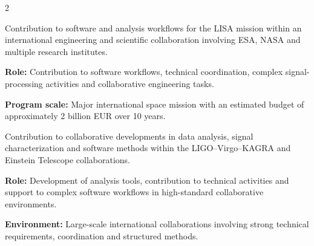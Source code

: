 \documentclass[8pt,a4paper,ragged2e,withhyper]{altacv}
\begin{document}
\begin{paracol}{2}







\end{paracol}

\newpage
{}


Contribution to software and analysis workflows for the LISA mission within an international engineering and scientific collaboration involving ESA, NASA and multiple research institutes.

\textbf{Role:} Contribution to software workflows, technical coordination, complex signal-processing activities and collaborative engineering tasks.

\textbf{Program scale:} Major international space mission with an estimated budget of approximately 2 billion EUR over 10 years.

\divider


Contribution to collaborative developments in data analysis, signal characterization and software methods within the LIGO--Virgo--KAGRA and Einstein Telescope collaborations.

\textbf{Role:} Development of analysis tools, contribution to technical activities and support to complex software workflows in high-standard collaborative environments.

\textbf{Environment:} Large-scale international collaborations involving strong technical requirements, coordination and structured methods.
\end{document}
